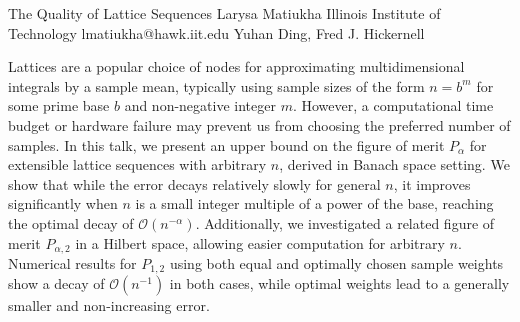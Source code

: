 \begin{talk}
  {The Quality of Lattice Sequences}%
  {Larysa Matiukha}%
  {Illinois Institute of Technology}%
  {lmatiukha@hawk.iit.edu}%
  {Yuhan Ding, Fred J. Hickernell}%
  
    

Lattices are a popular choice of nodes for approximating multidimensional integrals by a sample mean, typically using sample sizes of the form $n = b^m$ for some prime base $b$ and non-negative integer $m$. However, a computational time budget or hardware failure may prevent us from choosing the preferred number of samples. In this talk, we present an upper bound on the figure of merit $P_\alpha$ for extensible lattice sequences with arbitrary $n$, derived in Banach space setting. We show that while the error decays relatively slowly for general $n$, it improves significantly when $n$ is a small integer multiple of a power of the base, reaching the optimal decay of $\mathcal{O}(n^{-\alpha})$. %
Additionally, we investigated a related figure of merit $P_{\alpha,2}$ in a Hilbert space, allowing easier computation for arbitrary $n$. Numerical results for $P_{1,2}$ using both equal and optimally chosen sample weights show a decay of $\mathcal{O}(n^{-1})$ in both cases, while optimal weights lead to a generally smaller and non-increasing error. 





\end{talk}
